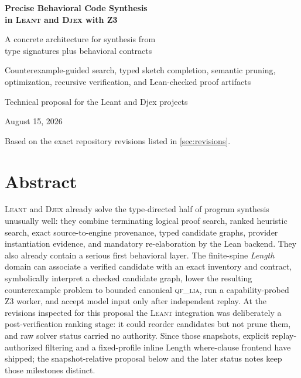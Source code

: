 \documentclass[11pt,oneside]{report}
\newcommand{\Leant}{\textsc{Leant}\xspace}
\newcommand{\Djex}{\textsc{Djex}\xspace}
\newcommand{\Zthree}{\textsc{Z3}\xspace}
\newcommand{\QFLIA}{\textsc{qf\_lia}\xspace}
\begin{document}
\hypersetup{pageanchor=false}
\begin{titlepage}
\centering
\vspace*{1.15in}
{\Huge\bfseries\color{ink} Precise Behavioral Code Synthesis\\[0.22em]
 in \Leant and \Djex with \Zthree\par}
\vspace{0.42in}
{\Large A concrete architecture for synthesis from\\
type signatures plus behavioral contracts\par}
\vspace{0.55in}
\begin{tcolorbox}[width=0.84\textwidth,colback=accentlight,colframe=accent,boxrule=0.8pt,arc=2mm]
\centering
\large Counterexample-guided search, typed sketch completion, semantic pruning, optimization, recursive verification, and Lean-checked proof artifacts
\end{tcolorbox}
\vfill
{\large Technical proposal for the Leant and Djex projects\par}
\vspace{0.12in}
{\large August 15, 2026\par}
\vspace{0.42in}
{\small Based on the exact repository revisions listed in \cref{sec:revisions}.\par}
\end{titlepage}
\clearpage\hypersetup{pageanchor=true}
\chapter*{Abstract}

\Leant and \Djex already solve the type-directed half of program synthesis unusually well: they combine terminating logical proof search, ranked heuristic search, exact source-to-engine provenance, typed candidate graphs, provider instantiation evidence, and mandatory re-elaboration by the Lean backend. They also already contain a serious first behavioral layer. The finite-spine \emph{Length} domain can associate a verified candidate with an exact inventory and contract, symbolically interpret a checked candidate graph, lower the resulting counterexample problem to bounded canonical \QFLIA, run a capability-probed \Zthree worker, and accept model input only after independent replay. At the revisions inspected for this proposal the \Leant integration was deliberately a post-verification ranking stage: it could reorder candidates but not prune them, and raw solver status carried no authority. Since those snapshots, explicit replay-authorized filtering and a fixed-profile inline Length where-clause frontend have shipped; the snapshot-relative proposal below and the later status notes keep those milestones distinct.
\end{document}
